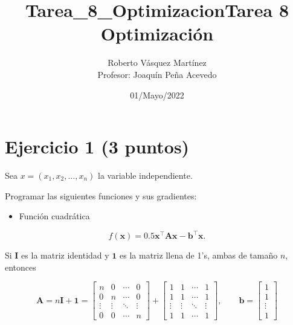 \documentclass[11pt]{article}
\title{Tarea\_8\_Optimizacion}
\providecommand{\tightlist}{%
      \setlength{\itemsep}{0pt}\setlength{\parskip}{0pt}}
\begin{document}
    
\title{Tarea 8 Optimización}
\author{Roberto Vásquez Martínez \\ Profesor: Joaquín Peña Acevedo}
\date{01/Mayo/2022}
\maketitle   
    
    

    
    \hypertarget{ejercicio-1-3-puntos}{%
\section{Ejercicio 1 (3 puntos)}\label{ejercicio-1-3-puntos}}

Sea \(x=(x_1, x_2, ..., x_n)\) la variable independiente.

Programar las siguientes funciones y sus gradientes:

\begin{itemize}
\tightlist
\item
  Función cuadrática
\end{itemize}

\[ f(\mathbf{x}) = 0.5\mathbf{x}^\top \mathbf{A}\mathbf{x} - \mathbf{b}^\top\mathbf{x}. \]

Si \(\mathbf{I}\) es la matriz identidad y \(\mathbf{1}\) es la matriz
llena de 1's, ambas de tamaño \(n\), entonces

\[ \mathbf{A} = n\mathbf{I} + \mathbf{1} = 
\left[\begin{array}{llll} n      & 0      & \cdots & 0 \\
                       0      & n      & \cdots & 0 \\ 
                       \vdots & \vdots & \ddots & \vdots \\
                       0      & 0      & \cdots & n \end{array}\right]
+ \left[\begin{array}{llll} 1    & 1      & \cdots & 1 \\
                       1      & 1      & \cdots & 1 \\ 
                       \vdots & \vdots & \ddots & \vdots \\
                       1      & 1      & \cdots & 1 \end{array}\right],  \qquad
\mathbf{b} = \left[\begin{array}{l} 1 \\ 1 \\ \vdots \\ 1 \end{array}\right] \]
\end{document}

